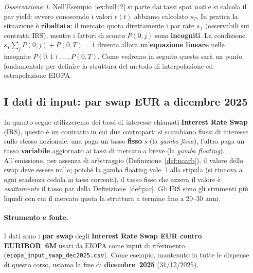 \documentclass[11pt,a4paper]{article}
\theoremstyle{plain}
\theoremstyle{definition}
\theoremstyle{remark}
\newtheorem*{osservazione}{Osservazione}
\begin{document}
\begin{osservazione}
\label{oss:inversione}
Nell'Esempio~\ref{ex:hull42} si parte dai tassi spot \emph{noti} e si calcola il par
yield: ovvero conoscendo i valori $r(t)$ abbiamo calcolato $s_T$. In pratica la situazione \`e \textbf{ribaltata}:
il mercato quota direttamente i par rate $s_T$ (osservabili sui contratti IRS), mentre i
fattori di sconto $P(0,j)$ sono \textbf{incogniti}. La condizione
$s_T\sum_{j}P(0,j)+P(0,T)=1$ diventa allora un'\textbf{equazione lineare} nelle
incognite $P(0,1),\ldots,P(0,T)$. Come vedremo in seguito questo sarà un punto fondamentale per definire la struttura del metodo di interpolazione ed estrapolazione EIOPA.%
\end{osservazione}



\subsection{I dati di input: par swap EUR a dicembre 2025}
\label{sec:dati-input}
In quanto segue utilizzeremo dei tassi di interesse chiamati \textbf{Interest Rate Swap} (IRS), questo \`e un contratto in cui due controparti si scambiano
flussi di interesse sullo stesso nozionale: una paga un tasso \textbf{fisso} $s$ (la
\emph{gamba fissa}), l'altra paga un tasso \textbf{variabile} aggiornato ai tassi di
mercato a breve (la \emph{gamba floating}). All'emissione, per assenza di arbitraggio
(Definizione~\ref{def:noarb}), il valore dello swap deve essere nullo; poich\'e la gamba
floating vale~1 alla stipula (si rinnova a ogni scadenza cedola ai tassi correnti), il
tasso fisso che azzera il valore \`e \emph{esattamente} il tasso par della
Definizione~\ref{def:par}. Gli IRS sono gli strumenti pi\`u liquidi con cui il mercato
quota la struttura a termine fino a 20--30 anni.

\paragraph{Strumento e fonte.} I dati sono i \textbf{par swap} degli \textbf{Interest Rate
Swap EUR contro EURIBOR~6M} usati da EIOPA come input di riferimento
(\texttt{eiopa\_input\_swap\_dec2025.csv}). Come esempio, mantenuto in tutte le dispense di
questo corso, usiamo la fine di \textbf{dicembre~2025} (31/12/2025).
\end{document}
